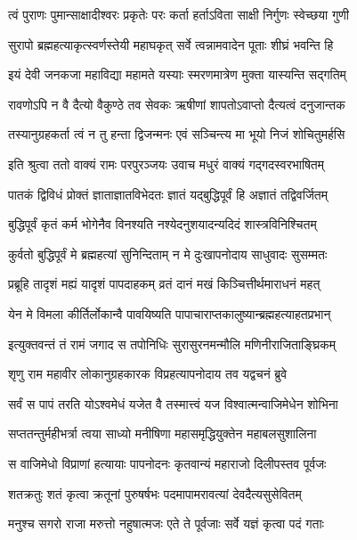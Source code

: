 \twolineshloka
{त्वं पुराणः पुमान्साक्षादीश्वरः प्रकृतेः परः}
{कर्ता हर्ताऽविता साक्षी निर्गुणः स्वेच्छया गुणी}%

\twolineshloka
{सुरापो ब्रह्महत्याकृत्स्वर्णस्तेयी महाघकृत्}
{सर्वे त्वन्नामवादेन पूताः शीघ्रं भवन्ति हि}%

\twolineshloka
{इयं देवी जनकजा महाविद्या महामते}
{यस्याः स्मरणमात्रेण मुक्ता यास्यन्ति सद्गतिम्}%

\twolineshloka
{रावणोऽपि न वै दैत्यो वैकुण्ठे तव सेवकः}
{ऋषीणां शापतोऽवाप्तो दैत्यत्वं दनुजान्तक}%

\twolineshloka
{तस्यानुग्रहकर्ता त्वं न तु हन्ता द्विजन्मनः}
{एवं सञ्चिन्त्य मा भूयो निजं शोचितुमर्हसि}%

\twolineshloka
{इति श्रुत्वा ततो वाक्यं रामः परपुरञ्जयः}
{उवाच मधुरं वाक्यं गद्गदस्वरभाषितम्}%


\twolineshloka
{पातकं द्विविधं प्रोक्तं ज्ञाताज्ञातविभेदतः}
{ज्ञातं यद्बुद्धिपूर्वं हि अज्ञातं तद्विवर्जितम्}%

\twolineshloka
{बुद्धिपूर्वं कृतं कर्म भोगेनैव विनश्यति}
{नश्येदनुशयादन्यदिदं शास्त्रविनिश्चितम्}%

\twolineshloka
{कुर्वतो बुद्धिपूर्वं मे ब्रह्महत्यां सुनिन्दिताम्}
{न मे दुःखापनोदाय साधुवादः सुसम्मतः}%

\twolineshloka
{प्रब्रूहि तादृशं मह्यं यादृशं पापदाहकम्}
{व्रतं दानं मखं किञ्चित्तीर्थमाराधनं महत्}%

\twolineshloka
{येन मे विमला कीर्तिर्लोकान्वै पावयिष्यति}
{पापाचाराप्तकालुष्यान्ब्रह्महत्याहतप्रभान्}%


\twolineshloka
{इत्युक्तवन्तं तं रामं जगाद स तपोनिधिः}
{सुरासुरनमन्मौलि मणिनीराजिताङ्घ्रिकम्}%

\twolineshloka
{शृणु राम महावीर लोकानुग्रहकारक}
{विप्रहत्यापनोदाय तव यद्वचनं ब्रुवे}%

\twolineshloka
{सर्वं स पापं तरति योऽश्वमेधं यजेत वै}
{तस्मात्त्वं यज विश्वात्मन्वाजिमेधेन शोभिना}%

\twolineshloka
{सप्ततन्तुर्महीभर्त्रा त्वया साध्यो मनीषिणा}
{महासमृद्धियुक्तेन महाबलसुशालिना}%

\twolineshloka
{स वाजिमेधो विप्राणां हत्यायाः पापनोदनः}
{कृतवान्यं महाराजो दिलीपस्तव पूर्वजः}%

\twolineshloka
{शतक्रतुः शतं कृत्वा क्रतूनां पुरुषर्षभः}
{पदमापामरावत्यां देवदैत्यसुसेवितम्}%

\twolineshloka
{मनुश्च सगरो राजा मरुत्तो नहुषात्मजः}
{एते ते पूर्वजाः सर्वे यज्ञं कृत्वा पदं गताः}%

